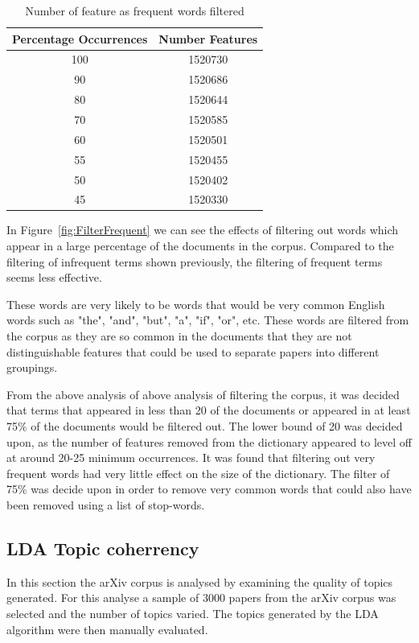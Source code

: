 \begin{table}[h]
    \centering
    \begin{tabular}{|c c|}
         \hline
         Percentage Occurrences & Number Features \\ [0.5ex]
         \hline\hline
         100 & 1520730 \\
         90 & 1520686 \\
         80 & 1520644 \\
         70 & 1520585 \\
         60 & 1520501 \\
         55 & 1520455 \\
         50 & 1520402 \\
         45 & 1520330 \\ [1ex]
         \hline
    \end{tabular}
    \caption{Number of feature as frequent words filtered}
    \label{table:frequentFeatures}
\end{table}

In Figure~\ref{fig:FilterFrequent} we can see the effects of filtering out words which appear in a large percentage of the documents in the corpus.
Compared to the filtering of infrequent terms shown previously, the filtering of frequent terms seems less effective.

These words are very likely to be words that would be very common English words such as "the", "and", "but", "a", "if", "or", etc.
These words are filtered from the corpus as they are so common in the documents that they are not distinguishable features that could be used to separate papers into different groupings.

From the above analysis of above analysis of filtering the corpus, it was decided that terms that appeared in less than 20 of the documents or appeared in at least 75\% of the documents would be filtered out.
The lower bound of 20 was decided upon, as the number of features removed from the dictionary appeared to level off at around 20-25 minimum occurrences.
It was found that filtering out very frequent words had very little effect on the size of the dictionary.
The filter of 75\% was decide upon in order to remove very common words that could also have been removed using a list of stop-words.

\subsection{LDA Topic coherrency}
In this section the arXiv corpus is analysed by examining the quality of topics generated.
For this analyse a sample of 3000 papers from the arXiv corpus was selected and the number of topics varied.
The topics generated by the LDA algorithm were then manually evaluated.


